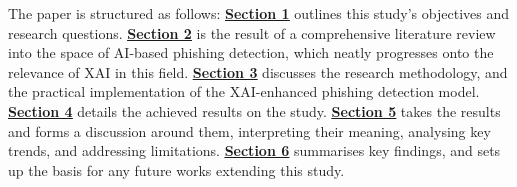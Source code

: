 
\noindent The paper is structured as follows: \hyperref[sec:1-introduction]{\uline{\textbf{Section 1}}} outlines this study's objectives and research questions. \hyperref[sec:2-literature-review]{\uline{\textbf{Section 2}}} is the result of a comprehensive literature review into the space of AI-based phishing detection, which neatly progresses onto the relevance of XAI in this field. \hyperref[sec:3-research-methodology]{\uline{\textbf{Section 3}}} discusses the research methodology, and the practical implementation of the XAI-enhanced phishing detection model. \hyperref[sec:4-results]{\uline{\textbf{Section 4}}} details the achieved results on the study. \hyperref[sec:5-discussion]{\uline{\textbf{Section 5}}} takes the results and forms a discussion around them, interpreting their meaning, analysing key trends, and addressing limitations. \hyperref[sec:6-conclusion]{\uline{\textbf{Section 6}}} summarises key findings, and sets up the basis for any future works extending this study.
